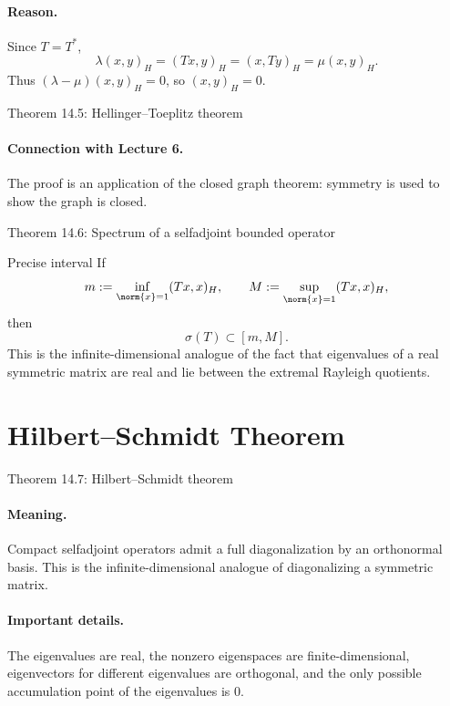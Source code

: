 \documentclass[11pt]{article}
\begin{document}
\paragraph{Reason.}
Since $T=T^*$,
\[
\lambda(x,y)_H=(Tx,y)_H=(x,Ty)_H=\mu(x,y)_H.
\]
Thus $(\lambda-\mu)(x,y)_H=0$, so $(x,y)_H=0$.

\begin{thmbox}{Theorem 14.5: Hellinger--Toeplitz theorem}
\thmHellingerToeplitz
\end{thmbox}

\paragraph{Connection with Lecture 6.}
The proof is an application of the closed graph theorem: symmetry is used to show the graph is closed.

\begin{thmbox}{Theorem 14.6: Spectrum of a selfadjoint bounded operator}
\thmSelfadjointSpectrumReal
\end{thmbox}

\begin{exbox}{Precise interval}
If
\[
m:=\inf_{\norm{x}=1}(Tx,x)_H,
\qquad
M:=\sup_{\norm{x}=1}(Tx,x)_H,
\]
then
\[
\sigma(T)\subset [m,M].
\]
This is the infinite-dimensional analogue of the fact that eigenvalues of a real symmetric matrix are real and lie between the extremal Rayleigh quotients.
\end{exbox}

\section{Hilbert--Schmidt Theorem}

\begin{thmbox}{Theorem 14.7: Hilbert--Schmidt theorem}
\thmHilbertSchmidt
\end{thmbox}

\paragraph{Meaning.}
Compact selfadjoint operators admit a full diagonalization by an orthonormal basis. This is the infinite-dimensional analogue of diagonalizing a symmetric matrix.

\paragraph{Important details.}
The eigenvalues are real, the nonzero eigenspaces are finite-dimensional, eigenvectors for different eigenvalues are orthogonal, and the only possible accumulation point of the eigenvalues is $0$.
\end{document}
